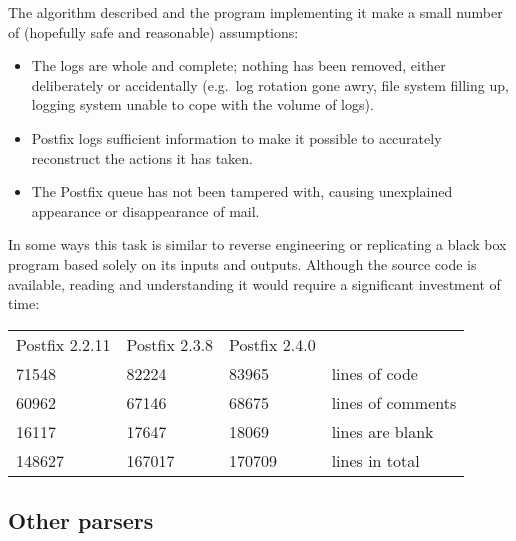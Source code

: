 \documentclass[a4paper,12pt,draft]{article}
\begin{document}
The algorithm described and the program implementing it make a small number
of (hopefully safe and reasonable) assumptions:

\begin{itemize}

    \item The logs are whole and complete; nothing has been removed, either
        deliberately or accidentally (e.g.\ log rotation gone awry, file
        system filling up, logging system unable to cope with the volume of
        logs).

    \item Postfix logs sufficient information to make it possible to
        accurately reconstruct the actions it has taken.

    \item The Postfix queue has not been tampered with, causing unexplained
        appearance or disappearance of mail.

\end{itemize}

In some ways this task is similar to reverse engineering or replicating a
black box program based solely on its inputs and outputs.  Although the
source code is available, reading and understanding it would require a
significant investment of time:

\begin{tabular}[]{llll}

    Postfix 2.2.11  & Postfix 2.3.8   & Postfix 2.4.0 &                   \\
    71548           & 82224           & 83965         & lines of code     \\
    60962           & 67146           & 68675         & lines of comments \\
    16117           & 17647           & 18069         & lines are blank   \\
    148627          & 167017          & 170709        & lines in total    \\

\end{tabular}


\subsection{Other parsers}
\end{document}
